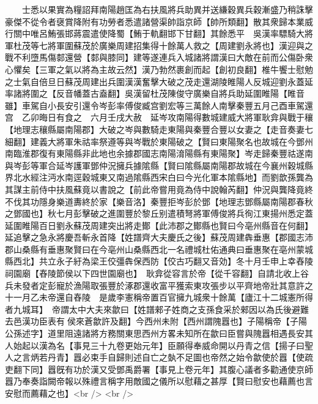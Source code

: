 　　士悉以果實為糧詔拜南陽趙匡為右扶風將兵助異并送縑穀異兵穀漸盛乃稍誅擊豪傑不從令者襃賞降附有功勞者悉遣諸營渠帥詣京師【帥所類翻】散其衆歸本業威行關中唯呂鮪張邯蔣震遣使降蜀【鮪于軌翻邯下甘翻】其餘悉平　吳漢率驃騎大將軍杜茂等七將軍圍蘇茂於廣樂周建招集得十餘萬人救之【周建劉永將也】漢迎與之戰不利墮馬傷䣛還營【䣛與膝同】建等遂連兵入城諸將謂漢曰大敵在前而公傷卧衆心懼矣【三軍之氣以將為主故云然】漢乃勃然裹創而起【創初良翻】椎牛饗士慰勉之士氣自倍旦日蘇茂周建出兵圍漢漢奮擊大破之茂走還湖陵睢陽人反城迎劉永蓋延率諸將圍之【反音幡蓋古盍翻】吳漢留杜茂陳俊守廣樂自將兵助延圍睢陽【睢音雖】車駕自小長安引還令岑彭率傅俊臧宫劉宏等三萬餘人南擊秦豐五月己酉車駕還宫　乙卯晦日有食之　六月壬戌大赦　延岑攻南陽得數城建威大將軍耿弇與戰于穰【地理志穰縣屬南陽郡】大破之岑與數騎走東陽與秦豐合豐以女妻之【走音奏妻七細翻】建義大將軍朱祜率祭遵等與岑戰於東陽破之【賢曰東陽聚名也故城在今鄧州南臨淮郡復有東陽縣非此地也余據郡國志南陽淯陽縣有東陽聚】岑走歸秦豐祜遂南與岑彭等軍合延岑護軍鄧仲況擁兵據隂縣【賢曰隂縣屬南陽郡故城在今襄州穀城縣界北水經注沔水南逕穀城東又南過隂縣西宋白曰今光化軍本隂縣地】而劉歆孫龔為其謀主前侍中扶風蘇竟以書說之【前此帝嘗用竟為侍中說翰芮翻】仲況與龔降竟終不伐其功隱身樂道夀終於家【樂音洛】秦豐拒岑彭於鄧【地理志鄧縣屬南陽郡春秋之鄧國也】秋七月彭擊破之進圍豐於黎丘别遣積弩將軍傅俊將兵徇江東揚州悉定蓋延圍睢陽百日劉永蘇茂周建突出將走鄼【此沛郡之鄼縣也賢曰今亳州縣音在何翻】延追擊之急永將慶吾斬永首降【姓譜齊大夫慶氏之後】蘇茂周建犇垂惠【郡國志沛郡山桑縣有垂惠聚賢曰在今亳州山桑縣西北一名禮城杜佑通典曰垂惠聚在亳州蒙城縣西北】共立永子紆為梁王佼彊犇保西防【佼古巧翻又音効】冬十月壬申上幸舂陵祠園廟【舂陵節侯以下四世園廟也】　耿弇從容言於帝【從千容翻】自請北收上谷兵未發者定彭寵於漁陽取張豐於涿郡還收富平獲索東攻張步以平齊地帝壯其意許之十一月乙未帝還自舂陵　是歲李憲稱帝置百官擁九城衆十餘萬【廬江十二城憲所得者九城耳】　帝謂太中大夫來歙曰【姓譜郲子姓商之支孫食采於郲因以為氏後避難去邑漢功臣表有侯來蒼歙許及翻】今西州未附【西州謂隗囂也】子陽稱帝【子陽公孫述字】道里阻遠諸將方務關東思西州方畧未知所在歙曰臣嘗與隗囂相遇長安其人始起以漢為名【事見三十九卷更始元年】臣願得奉威命開以丹青之信【揚子曰聖人之言炳若丹青】囂必束手自歸則述自亡之埶不足圖也帝然之始令歙使於囂【使疏吏翻下同】囂旣有功於漢又受鄧禹爵署【事見上卷元年】其腹心議者多勸通使京師囂乃奉奏詣闕帝報以殊禮言稱字用敵國之儀所以慰藉之甚厚【賢曰慰安也藉薦也言安慰而薦藉之也】<br />
<br />
